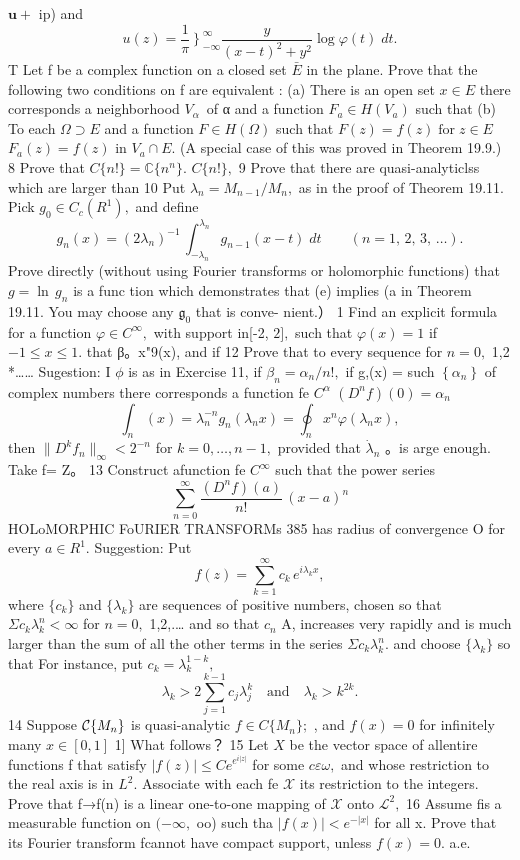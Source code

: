 $\boldsymbol{u+}$ ip) and $$ u(z)={\frac{1}{\pi}}\left.\right\}_{-\infty}^{\infty}{\frac{y}{(x-t)^{2}+y^{2}}}\log\varphi(t)\;d t. $$ T Let f be a complex function on a closed set $\bar{E}$ in the plane. Prove that the following two conditions on f are equivalent : (a) There is an open set $x\in E$ there corresponds a neighborhood $V_{\alpha}\,$ of α and a function $F_{a}\in H(V_{a})$ such that (b) To each $\Omega\supset E$ and a function $F\in H(\Omega)$ such that $F(z)=f(z)\operatorname{for}z\in E$ $F_{a}(z)=f(z)$ in $V_{a}\cap E.$ (A special case of this was proved in Theorem 19.9.) 8 Prove that $C\{n!\}=\mathbb{C}\{n^{n}\}.$ $C\{n!\},$ 9 Prove that there are quasi-analyticlss which are larger than 10 Put $\lambda_{n}=M_{n-1}/M_{n},$ as in the proof of Theorem 19.11. Pick $g_{0}\in C_{c}(R^{1}),$ and define $$ g_{n}(x)=(2\lambda_{n})^{-1}\,\int_{-\lambda_{n}}^{\lambda_{n}}g_{n-1}(x-t)\;d t\qquad(n=1,\,2,\,3,\,\dots). $$ Prove directly (without using Fourier transforms or holomorphic functions) that $g=\ln\,g_{n}$ is a func tion which demonstrates that (e) implies (a in Theorem 19.11. You may choose any ${\mathfrak{g}}_{0}$ that is conve- nient.） 1 Find an explicit formula for a function $\varphi\in C^{\infty},$ with support in[-2, $2],$ such that $\varphi(x)=1$ if $-1\leq x\leq1.$ that β。x"9(x), and if 12 Prove that to every sequence for $n=0,$ 1,2 *…… Sugestion: I $\textstyle\phi$ is as in Exercise 11, if $\beta_{n}=\alpha_{n}/n!,$ if g,(x) = such $\left\{\alpha_{n}\right\}$ of complex numbers there corresponds a function fe $C^{\alpha}$ $(D^{n}f)(0)=\alpha_{n}$ $$ \textstyle\int_{n}(x)=\lambda_{n}^{-n}g_{n}(\lambda_{n}x)=\oint_{n}x^{n}\varphi(\lambda_{n}x), $$ then $\|D^{k}f_{n}\|_{\infty}<2^{-n}$ for $k=0,\ldots,n-1,$ provided that $\scriptstyle{\dot{\lambda}}_{n}$ 。is arge enough. Take f= Z。 13 Construct afunction fe $C^{\infty}$ such that the power series $$ \sum_{n=0}^{\infty}{\frac{(D^{n}f)(a)}{n!}}\,(x-a)^{n} $$HOLoMORPHIC FoURIER TRANSFORMs 385 has radius of convergence O for every $a\in R^{1}.$ Suggestion: Put $$ f(z)=\sum_{k=1}^{\infty}c_{k}\,e^{i\lambda_{k}x}, $$ where $\{c_{k}\}$ and $\{\lambda_{k}\}$ are sequences of positive numbers, chosen so that $\Sigma c_{k}\lambda_{k}^{n}<\infty$ for $n=0,$ 1,2,.… and so that $c_{n}$ A, increases very rapidly and is much larger than the sum of all the other terms in the series $\Sigma c_{k}\lambda_{k}^{n}.$ and choose $\{\lambda_{k}\}$ so that For instance, put $c_{k}=\lambda_{k}^{1-k},$ $$ \lambda_{k}>2\sum_{j=1}^{k-1}c_{j}\lambda_{j}^{k}\quad\mathrm{and}\quad\lambda_{k}>k^{2k}. $$ 14 Suppose ${\cal C}\{M_{n}\}$ is quasi-analytic $f\in C\{M_{n}\};$ , and $f(x)=0$ for infinitely many $x\in[0,1]$ 1] What follows？ 15 Let $X$ be the vector space of allentire functions f that satisfy $|f(z)|\leq C e^{e^{i|z|}}$ for some $c\varepsilon\omega,$ and whose restriction to the real axis is in $L^{2}.$ Associate with each fe $\scriptstyle{\mathcal{X}}$ its restriction to the integers. Prove that f→{f(n)} is a linear one-to-one mapping of $\scriptstyle{\mathcal{X}}$ onto ${\mathcal{L}}^{2},$ 16 Assume fis a measurable function on $(-\infty,$ oo) such tha $|f(x)|<e^{-|x|}$ for all x. Prove that its Fourier transform fcannot have compact support, unless $f(x)=0.$ a.e.